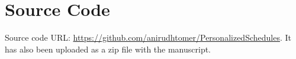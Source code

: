 \section{Source Code}
Source code URL: \url{https://github.com/anirudhtomer/PersonalizedSchedules}. It has also been uploaded as a zip file with the manuscript.